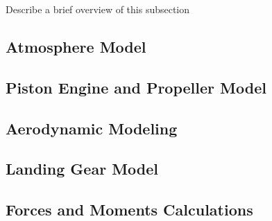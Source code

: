 \documentclass[../chapter_2.tex]{subfiles}
\begin{document}
Describe a brief overview of this subsection
\subsection{Atmosphere Model}


\subsection{Piston Engine and Propeller Model}


\subsection{Aerodynamic Modeling}


\subsection{Landing Gear Model}


\subsection{Forces and Moments Calculations}

\end{document}
